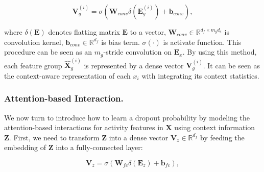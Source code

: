 \begin{equation}
\mathbf{V}^{(i)}_g = \sigma(\mathbf{W}_{conv} \delta (\mathbf{E}_g^{(i)})+\mathbf{b}_{conv}), %
\end{equation}

\noindent where $\delta (\mathbf{E})$ denotes flatting matrix $\mathbf{E}$ to a vector, $\mathbf{W}_{conv} \in \mathbb{R}^{d_f \times m_gd_e}$ is convolution kernel, $\mathbf{b}_{conv} \in \mathbb{R}^{d_f}$ is bias term. $\sigma(\cdot)$ is activate function. This procedure can be seen as an $m_g$-stride convolution on $\mathbf{E}_x$.
By using this method, each feature group $\hat{\mathbf{X}}_g^{(i)}$ is represented by a dense vector $\mathbf{V}^{(i)}_g$. It can be seen as the context-aware representation of each $x_i$ with integrating its context statistics. 

\subsubsection{Attention-based Interaction.}
We now turn to introduce how to learn a dropout probability by modeling the attention-based interactions for activity features in $\mathbf{X}$ using context information $\mathbf{Z}$. First, we need to transform $\mathbf{Z}$ into a dense vector $\mathbf{V}_z \in \mathbb{R}^{d_f}$ by feeding the embedding of $\mathbf{Z}$ into a fully-connected layer:

\begin{equation}
\mathbf{V}_z = \sigma(\mathbf{W}_{fc} \delta(\mathbf{E}_z) + \mathbf{b}_{fc}),
\end{equation}

